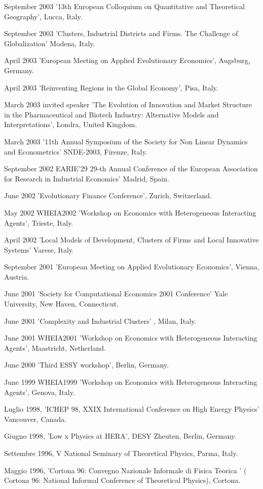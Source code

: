 \documentclass[a4paper]{article}
\begin{document}
September 2003 '13th European Colloquium on Quantitative and
Theoretical Geography', Lucca, Italy.

September 2003 'Clusters, Industrial Districts and Firms. The
Challenge of Globalization' Modena, Italy.

April 2003 'European Meeting on Applied Evolutionary Economics',
Augsburg, Germany.

April 2003 'Reinventing Regions in the Global Economy', Pisa, Italy.

March 2003 invited speaker 'The Evolution of Innovation and Market
Structure in the Pharmaceutical and Biotech Industry: Alternative
Models and Interpretations', Londra, United Kingdom.

March 2003 '11th Annual Symposium of the Society for Non Linear
Dynamics and Econometrics' SNDE-2003, Firenze, Italy.

September 2002 EARIE'29 29-th Annual Conference of the European
Association for Research in Industrial Economics' Madrid, Spain.

June 2002 'Evolutionary Finance Conference', Zurich, Switzerland.

May 2002 WHEIA2002 'Workshop on Economics with Heterogeneous
Interacting Agents', Trieste, Italy.

April 2002 'Local Models of Development, Clusters of Firms and Local
Innovative Systems' Varese, Italy.

September 2001 'European Meeting on Applied Evolutionary Economics',
Vienna, Austria.

June 2001 'Society for Computational Economics 2001 Conference' Yale
University, New Haven, Connecticut.

June 2001 'Complexity and Industrial Clusters' , Milan, Italy.

June 2001 WHEIA2001 'Workshop on Economics with Heterogeneous
Interacting Agents', Maastricht, Netherland.

June 2000 'Third ESSY workshop', Berlin, Germany.

June 1999 WHEIA1999 'Workshop on Economics with Heterogeneous
Interacting Agents', Genova, Italy.

Luglio 1998, 'ICHEP 98, XXIX International Conference on High Energy
Physics' Vancouver, Canada.

Giugno 1998, 'Low x Physics at HERA', DESY Zheuten, Berlin, Germany.

Settembre 1996, V National Seminary of Theoretical Physics, Parma,
Italy.

Maggio 1996, 'Cortona 96: Convegno Nazionale Informale di Fisica
Teorica ' ( Cortona 96: National Informal Conference of Theoretical
Physics), Cortona.
\end{document}
